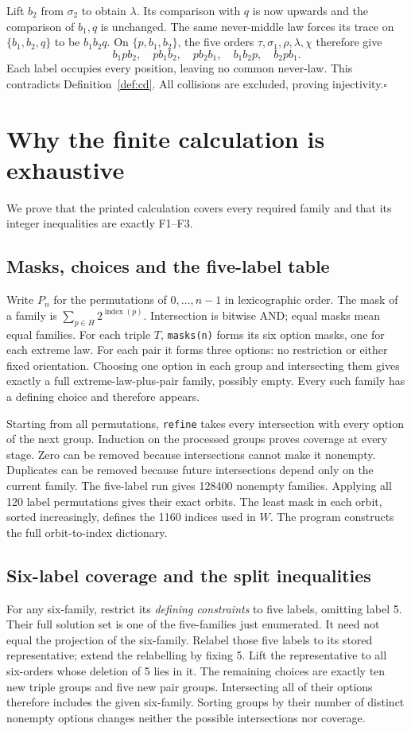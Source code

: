 \documentclass[11pt,letterpaper]{article}
\theoremstyle{definition}
\begin{document}
Lift \(b_2\) from \(\sigma_2\) to obtain \(\lambda\). Its
comparison with \(q\) is now upwards and the comparison of
\(b_1,q\) is unchanged. The same never-middle law forces its trace
on \(\{b_1,b_2,q\}\) to be \(b_1b_2q\).
On \(\{p,b_1,b_2\}\), the five orders
\(\tau,\sigma_1,\rho,\lambda,\chi\) therefore give
\[
 b_1pb_2,\quad pb_1b_2,\quad pb_2b_1,\quad
 b_1b_2p,\quad b_2pb_1.
\]
Each label occupies every position, leaving no common never-law.
This contradicts Definition~\ref{def:cd}. All collisions are
excluded, proving injectivity.\hfill\(\square\)

\clearpage
\section{Why the finite calculation is exhaustive}\label{app:coverage}
We prove that the printed calculation covers every required family
and that its integer inequalities are exactly F1--F3.

\subsection{Masks, choices and the five-label table}
Write \(P_n\) for the permutations of \(0,\ldots,n-1\) in
lexicographic order. The mask of a family is
\(\sum_{p\in H}2^{\operatorname{index}(p)}\). Intersection is bitwise
AND; equal masks mean equal families.
For each triple \(T\), \texttt{masks(n)} forms its six option masks,
one for each extreme law. For each pair it forms three options:
no restriction or either fixed orientation. Choosing one option in
each group and intersecting them gives exactly a full
extreme-law-plus-pair family, possibly empty. Every such family has
a defining choice and therefore appears.

Starting from all permutations, \texttt{refine} takes every intersection
with every option of the next group. Induction on the processed groups
proves coverage at every stage. Zero can be removed because intersections
cannot make it nonempty. Duplicates can be removed because future
intersections depend only on the current family.
The five-label run gives 128400 nonempty families. Applying all 120
label permutations gives their exact orbits. The least mask in each
orbit, sorted increasingly, defines the 1160 indices used in \(W\).
The program constructs the full orbit-to-index dictionary.

\subsection{Six-label coverage and the split inequalities}
For any six-family, restrict its \emph{defining constraints} to five
labels, omitting label 5. Their full solution set is one of the
five-families just enumerated. It need not equal the projection of
the six-family. Relabel those five labels to its stored representative;
extend the relabelling by fixing 5. Lift the representative to all
six-orders whose deletion of 5 lies in it. The remaining choices are
exactly ten new triple groups and five new pair groups. Intersecting
all of their options therefore includes the given six-family.
Sorting groups by their number of distinct nonempty options changes
neither the possible intersections nor coverage.
\end{document}
